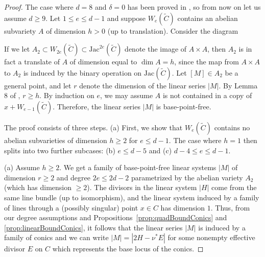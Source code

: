 \documentclass[fontsize=11pt,reqno]{amsart}
\theoremstyle{definition}
\theoremstyle{remark}
\newcommand{\tC}{\widetilde{C}}
\newcommand{\Sym}{\mathrm{Sym}}
\newcommand{\Jac}{\mathrm{Jac}}
\begin{document}
\begin{proof}
    The case where $d = 8$ and $\delta = 0$ has been proved in \cite{DK94}, so from now on let us assume $d \geq 9$. Let $1 \leq e \leq d-1$ and suppose $W_{e}(\tC)$ contains an abelian subvariety $A$ of dimension $h > 0$ (up to translation). Consider the diagram
    \begin{center}
    \end{center}
If we let $A_{2} \subset W_{2e}(\tC) \subset \Jac^{2e}(\tC)$ denote the image of $A \times A$, then $A_{2}$ is in fact a translate of $A$ of dimension equal to $\dim A = h$, since the map from $A \times A$ to $A_{2}$ is induced by the binary operation on $\Jac(\tC)$. Let $[M] \in A_2$ be a general point, and let $r$ denote the dimension of the linear series $|M|$. By Lemma 8 of \cite{Abramovich91}, $r\geq h$. By induction on $e$, we may assume $A$ is not contained in a copy of $x+W_{e-1}(\tC)$. Therefore, the linear series $|M|$ is base-point-free.

The proof consists of three steps. (a) First, we show that $W_{e}(\tC)$ contains no abelian subvarieties of dimension $h \geq 2$ for $e\leq d-1$. The case where $h = 1$ then splits into two further subcases: (b) $e \leq d-5$ and (c) $d-4 \leq e \leq d-1$.

(a) Assume $h\geq 2$. We get a family of base-point-free linear systems $|M|$ of dimension $r\geq 2$ and degree $2e\leq 2d-2$ parametrized by the abelian variety $A_2$ (which has dimension $\geq 2$). The divisors in the linear system $|H|$ come from the same line bundle (up to isomorphism), and the linear system induced by a family of lines through a (possibly singular) point $x \in C$ has dimension $1$. Thus, from our degree assumptions and Propositions~\ref{prop:quadBoundConics} and \ref{prop:linearBoundConics}, it follows that the linear series $|M|$ is induced by a family of conics and we can write $|M| = |2H - \nu^{\ast} E|$ for some nonempty effective divisor $E$ on $C$ which represents the base locus of the conics.


\end{proof}
\end{document}

